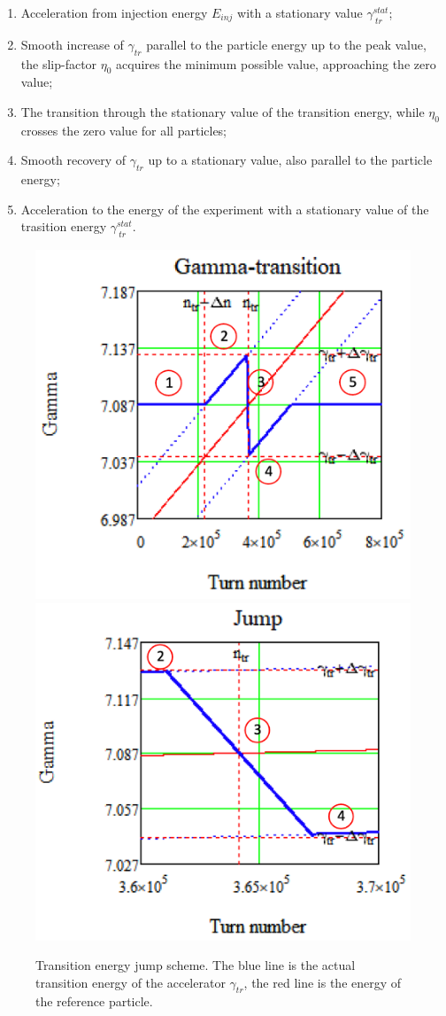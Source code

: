 \documentclass[
aps,%
12pt,%
final,%
notitlepage,%
oneside,%
onecolumn,%
nobibnotes,%
nofootinbib,%
superscriptaddress,%
noshowpacs,%
centertags]%
{revtex4}
\begin{document}
\begin{enumerate} 
  \item Acceleration from injection energy $E_{inj}$ with a stationary value $\gamma_{\ tr}^{stat}$;
  \item Smooth increase of $\gamma_{tr}$ parallel to the particle energy up to the peak value, the slip-factor $\eta_0$ acquires the minimum possible value, approaching the zero value;
  \item The transition through the stationary value of the transition energy, while $\eta_0$ crosses the zero value for all particles;
  \item Smooth recovery of $\gamma_{tr}$ up to a stationary value, also parallel to the particle energy;
  \item Acceleration to the energy of the experiment with a stationary value of the trasition energy $\gamma_{\ tr}^{stat}$.
  \end{enumerate}

\begin{figure}[!h]
\setcaptionmargin{5mm}
   \includegraphics*[width=.49\columnwidth]{img/fig_01-1}
   \includegraphics*[width=.49\columnwidth]{img/fig_01-2}
\caption{Transition energy jump scheme. The blue line is the actual transition energy of the accelerator $\gamma_{tr}$, the red line is the energy of the reference particle.}
\label{fig:jump}
\end{figure}
\end{document}
